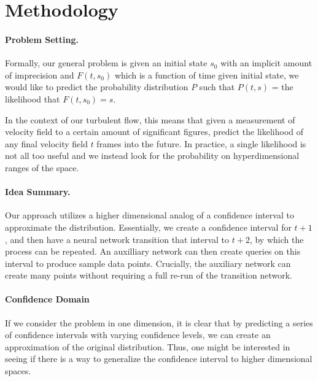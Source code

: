 \documentclass{article}
\begin{document}
    \section{Methodology}

    \paragraph{Problem Setting.}
    Formally, our general problem is given an initial state $s_0$ with an implicit amount of imprecision and $F(t, s_0)$ which is a function of time given initial state, we would like to predict the probability distribution $P$ such that $P(t,s)$ = the likelihood that $F(t,s_0) = s$.

    In the context of our turbulent flow, this means that given a measurement of velocity field to a certain amount of significant figures, predict the likelihood of any final velocity field $t$ frames into the future. In practice, a single likelihood is not all too useful and we instead look for the probability on hyperdimensional ranges of the space.

    \paragraph{Idea Summary.}
    Our approach utilizes a higher dimensional analog of a confidence interval to approximate the distribution. Essentially, we create a confidence interval for $t + 1$, and then have a neural network transition that interval to $t + 2$, by which the process can be repeated. An auxilliary network can then create queries on this interval to produce sample data points. Crucially, the auxiliary network can create many points without requiring a full re-run of the transition network.

    \paragraph{Confidence Domain}
    If we consider the problem in one dimension, it is clear that by predicting a series of confidence intervals with varying confidence levels, we can create an approximation of the original distribution. Thus, one might be interested in seeing if there is a way to generalize the confidence interval to higher dimensional spaces.
\end{document}
